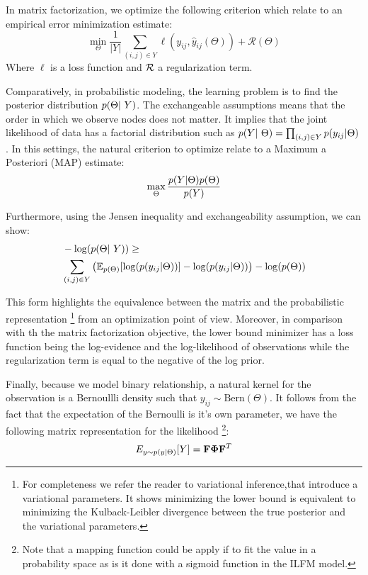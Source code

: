 In matrix factorization, we optimize the following criterion which relate to an empirical error minimization estimate:
\begin{displaymath}
    \min\limits_{\Theta} \frac{1}{|Y|} \sum_{(i,j) \in Y} \ell(y_{ij}, \hat y_{ij}(\Theta)) + \mathcal{R}(\Theta)
\end{displaymath}
Where $\ell$ is a loss function and $\cal R$ a regularization term.

Comparatively, in probabilistic modeling, the learning problem is to find the posterior distribution $\p(\Theta | Y)$. The exchangeable assumptions means that the order in which we observe nodes does not matter. It implies that the joint likelihood of data has a factorial distribution such as $\p(Y | \Theta) = \prod_{(i,j) \in Y} \p(y_{ij}| \Theta)$. In this settings, the natural criterion to optimize relate to a Maximum a Posteriori (MAP) estimate: 
\begin{displaymath}
    \max\limits_{\Theta}  \frac{p(Y | \Theta) p(\Theta)}{p(Y)}
\end{displaymath}

Furthermore, using the Jensen inequality and exchangeability assumption, we can show:
\begin{align}
    &- \log(\p(\Theta | Y)) \geq \nonumber \\  
    &\sum_{(i,j) \in Y} \left( \E_{p(\Theta)}[\log(\p(y_{ij}|\Theta))] - \log(\p(y_{ij}|\Theta)) \right) - \log(\p(\Theta))
\end{align}	


This form highlights the equivalence between the matrix and the probabilistic representation \footnote{For completeness we refer the reader to variational inference,that introduce a variational parameters. It shows minimizing the lower bound is equivalent to minimizing the Kulback-Leibler divergence between the true posterior and the variational parameters.} from an optimization point of view. Moreover, in comparison with th  the matrix factorization objective, the lower bound minimizer has a loss function being the log-evidence and the log-likelihood of observations while the regularization term is equal to the negative of the log prior.


Finally, because we model binary relationship, a natural kernel for the observation is a Bernoullli density such that $y_{ij} \sim \text{Bern}(\Theta)$. It follows from the fact that the expectation of the Bernoulli is it's own parameter, we have the following matrix representation for the likelihood \footnote{Note that a mapping function could be apply if to fit the value in a probability space as is it done with a sigmoid function in the ILFM model.}:
\begin{equation}
E_{y \sim p(y \mid \Theta)}[Y] = \mathbf{F} \mathbf{\Phi}  \mathbf{F}^T
\end{equation}

